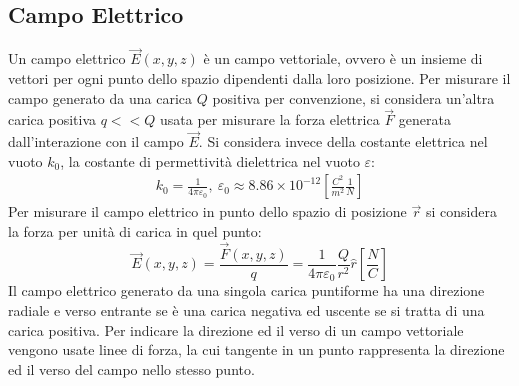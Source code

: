\documentclass{article}
\numberwithin{equation}{subsection}
\begin{document}
\subsection{Campo Elettrico}
Un campo elettrico $\vec{E}(x,y,z)$ è un campo vettoriale, ovvero è un insieme di vettori per ogni punto dello spazio dipendenti dalla loro posizione. Per misurare il campo 
generato da una carica $Q$ positiva per convenzione, si considera un'altra carica positiva $q<<Q$ usata per misurare la forza elettrica $\vec{F}$ generata dall'interazione con 
il campo $\vec{E}$. Si considera invece della costante elettrica nel vuoto $k_0$, la costante di permettività dielettrica nel vuoto $\varepsilon$:
\begin{gather}
    k_0=\displaystyle\frac{1}{4\pi\varepsilon_0},\:
    \varepsilon_0\approx8.86\times10^{-12}\left[\displaystyle\frac{C^2}{m^2}\frac{1}{N}\right]
\end{gather} 
Per misurare il campo elettrico in punto dello spazio di posizione $\vec{r}$ si considera la forza per unità di carica in quel punto:
\begin{equation}
    \vec{E}(x,y,z)=\displaystyle\frac{\vec{F}(x,y,z)}{q}=\frac{1}{4\pi\varepsilon_0}\frac{Q}{r^2}\hat{r}\left[\frac{N}{C}\right]
\end{equation}
Il campo elettrico generato da una singola carica puntiforme ha una direzione radiale e verso entrante se è una carica negativa ed uscente se si tratta di una carica positiva. 
Per indicare la direzione ed il verso di un campo vettoriale vengono usate linee di forza, la cui tangente in un punto rappresenta la direzione ed il verso del campo nello 
stesso punto. 
\begin{center}
\end{center}
\end{document}
